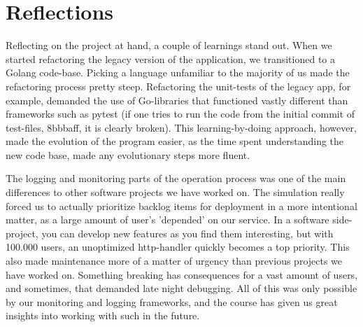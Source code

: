 \section{Reflections}
Reflecting on the project at hand, a couple of learnings stand out. When we started refactoring the legacy version of the application, we transitioned to a Golang code-base. Picking a language unfamiliar to the majority of us made the refactoring process pretty steep. Refactoring the unit-tests of the legacy app, for example, demanded the use of Go-libraries that functioned vastly different than frameworks such as pytest (if one tries to run the code from the initial commit of test-files, 8bbbaff, it is clearly broken). This learning-by-doing approach, however, made the evolution of the program easier, as the time spent understanding the new code base, made any evolutionary steps more fluent.

The logging and monitoring parts of the operation process was one of the main differences to other software projects we have worked on. The simulation really forced us to actually prioritize backlog items for deployment in a more intentional matter, as a large amount of user's 'depended' on our service. In a software side-project, you can develop new features as you find them interesting, but with 100.000 users, an unoptimized http-handler quickly becomes a top priority. This also made maintenance more of a matter of urgency than previous projects we have worked on. Something breaking has consequences for a vast amount of users, and sometimes, that demanded late night debugging. All of this was only possible by our monitoring and logging frameworks, and the course has given us great insights into working with such in the future. 